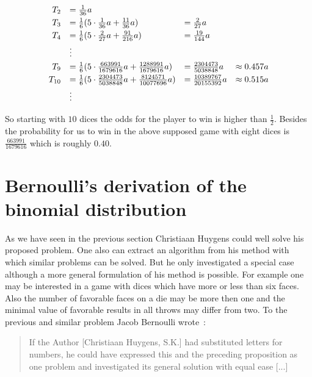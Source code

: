 \begin{align}
  \begin{array}{rlll}
    T_2 & = \frac 1{36} a \nl
    T_3 & = \frac 16 (5 \cdot \frac 1{36} a + \frac{11}{36} a) &= \frac 2{27} a \nl
    T_4 & = \frac 16 (5 \cdot \frac 2{27} a + \frac{91}{216} a) &= \frac {19}{144} a \nl
    & \vdots \nl
    T_9 & = \frac 16 (5 \cdot \frac {663991}{1679616} a + \frac{1288991}{1679616} a) &= \frac {2304473}{5038848} a & \approx 0.457 a \nl
    T_{10} & = \frac 16 (5 \cdot \frac{2304473}{5038848} a + \frac{8124571}{10077696} a) &= \frac{10389767}{20155392} a & \approx 0.515 a \nl
    & \vdots 
  \end{array}
\end{align}

So starting with $10$ dices the odds for the player to win is higher than $\tfrac 12$. Besides the probability for us to win in the above supposed game with eight dices is $\tfrac{663991}{1679616}$ which is roughly $0.40$.

\section{Bernoulli's derivation of the binomial distribution}


As we have seen in the previous section Christiaan Huygens could well solve his proposed problem. One also can extract an algorithm from his method with which similar problems can be solved. But he only investigated a special case although a more general formulation of his method is possible. For example one may be interested in a game with dices which have more or less than six faces. Also the number of favorable faces on a die may be more then one and the minimal value of favorable results in all throws may differ from two. To the previous and similar problem Jacob Bernoulli wrote~\cite[p. 157]{bernoulli}:

\begin{quotation}
  If the Author [Christiaan Huygens, S.K.] had substituted letters for numbers, he could have expressed this and the preceding proposition as one problem and investigated its general solution with equal ease [...]
\end{quotation}

